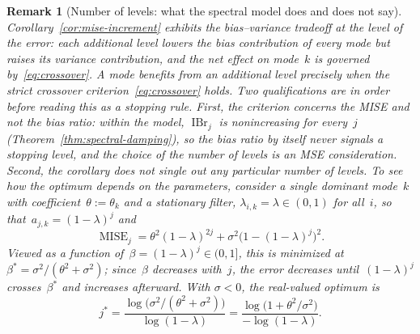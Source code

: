 \documentclass[12pt]{article}
\newtheorem{remark}{Remark}[section]
\DeclareMathOperator{\ibr}{IBr}
\DeclareMathOperator{\mise}{MISE}
\begin{document}
\begin{remark}[Number of levels: what the spectral model does and does not say]\label{rem:optimal-levels}
Corollary~\ref{cor:mise-increment} exhibits the bias--variance tradeoff at the level of the error: each additional level lowers the bias contribution of every mode but raises its variance contribution, and the net effect on mode~$k$ is governed by~\eqref{eq:crossover}. A mode benefits from an additional level precisely when the strict crossover criterion~\eqref{eq:crossover} holds. Two qualifications are in order before reading this as a stopping rule. First, the criterion concerns the MISE and not the bias ratio: within the model, $\ibr_j$ is nonincreasing for every~$j$ (Theorem~\ref{thm:spectral-damping}), so the bias ratio by itself never signals a stopping level, and the choice of the number of levels is an MSE consideration. Second, the corollary does not single out any particular number of levels. To see how the optimum depends on the parameters, consider a single dominant mode~$k$ with coefficient~$\theta:=\theta_k$ and a stationary filter, $\lambda_{i,k}=\lambda\in(0,1)$ for all~$i$, so that~$a_{j,k}=(1-\lambda)^j$ and
\[
    \mise_j=\theta^2(1-\lambda)^{2j}+\sigma^2\big(1-(1-\lambda)^j\big)^2 .
\]
Viewed as a function of~$\beta=(1-\lambda)^j\in(0,1]$, this is minimized at $\beta^\ast=\sigma^2/(\theta^2+\sigma^2)$; since~$\beta$ decreases with~$j$, the error decreases until~$(1-\lambda)^j$ crosses~$\beta^\ast$ and increases afterward. With $\sigma<0$, the real-valued optimum is
\[
    j^\ast=\frac{\log\!\big(\sigma^2/(\theta^2+\sigma^2)\big)}{\log(1-\lambda)}
    =\frac{\log\!\big(1+\theta^2/\sigma^2\big)}{-\log(1-\lambda)} .
\]

\end{remark}
\end{document}
